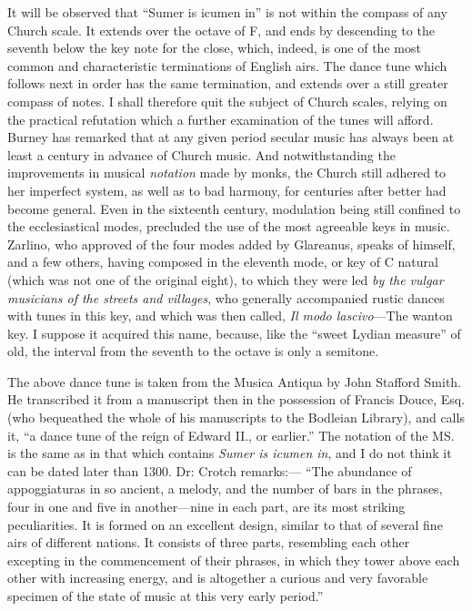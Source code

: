 It will be observed that “Sumer is icumen in” is not within the compass of
any Church scale. It extends over the octave of F, and ends by descending to the
seventh below the key note for the close, which, indeed, is one of the most common
and characteristic terminations of English airs. The dance tune which follows
next in order has the same termination, and extends over a still greater compass
of notes. I shall therefore quit the subject of Church scales, relying on the
practical refutation which a further examination of the tunes will afford. Burney
has remarked that at any given period secular music has always been at least a
century in advance of Church music. And notwithstanding the improvements
in musical \textit{notation} made by monks, the Church still adhered to her imperfect 
system, as well as to bad harmony, for \pagebreak
 centuries after better had become general.  
Even in the sixteenth century, modulation being still confined to the ecclesiastical
modes, precluded the use of the most agreeable keys in music. Zarlino, who
approved of the four modes added by Glareanus, speaks of himself, and a few
others, having composed in the eleventh mode, or key of C natural (which was not
one of the original eight), to which they were led \textit{by the vulgar musicians of the
streets and villages}, who generally accompanied rustic dances with tunes in this
key, and which was then called, \textit{Il modo lascivo}—The wanton key. I suppose it
acquired this name, because, like the “sweet Lydian measure” of old, the interval
from the seventh to the octave is only a semitone.





The above dance tune is taken from the Musica Antiqua by John Stafford
Smith. He transcribed it from a manuscript then in the possession of Francis
Douce, Esq. (who bequeathed the whole of his manuscripts to the Bodleian
Library), and calls it, “a dance tune of the reign of Edward II., or earlier.”
The notation of the MS. is the same \pagebreak
as in that which contains \textit{Sumer is icumen in}, 
and I do not think it can be dated later than 1300. Dr: Crotch remarks:—
“The abundance of appoggiaturas in so ancient, a melody, and the number of bars
in the phrases, four in one and five in another—nine in each part, are its most
striking peculiarities. It is formed on an excellent design, similar to that of
several fine airs of different nations. It consists of three parts, resembling each
other excepting in the commencement of their phrases, in which they tower above
each other with increasing energy, and is altogether a curious and very favorable
specimen of the state of music at this very early period.”

